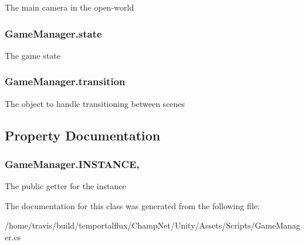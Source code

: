 The main camera in the open-\/world 

\hypertarget{class_game_manager_a8d86b330237462e38933b28276ed0e2c}{
\subsubsection[{state}]{ Game\-Manager.\-state}}\label{class_game_manager_a8d86b330237462e38933b28276ed0e2c}


The game state 

\hypertarget{class_game_manager_abae15982d4eb90ef9e5f3d24d15e22f2}{
\subsubsection[{transition}]{ Game\-Manager.\-transition}}\label{class_game_manager_abae15982d4eb90ef9e5f3d24d15e22f2}


The object to handle transitioning between scenes 



\subsection{Property Documentation}
\hypertarget{class_game_manager_a5c1d1f77dd4a2668a47a75c934c87075}{
\subsubsection[{I\-N\-S\-T\-A\-N\-C\-E}]{ Game\-Manager.\-I\-N\-S\-T\-A\-N\-C\-E\hspace{0.3cm}{\ttfamily [static]}, {\ttfamily [get]}}}\label{class_game_manager_a5c1d1f77dd4a2668a47a75c934c87075}


The public getter for the instance 



The documentation for this class was generated from the following file\-:\begin{DoxyCompactItemize}
\item 
/home/travis/build/temportalflux/\-Champ\-Net/\-Unity/\-Assets/\-Scripts/Game\-Manager.\-cs\end{DoxyCompactItemize}

